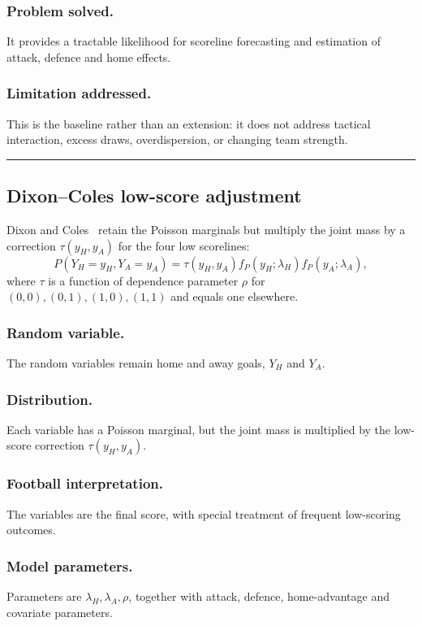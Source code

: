 \documentclass[11pt,a4paper]{amsart}
\numberwithin{equation}{section}
\begin{document}
\subsubsection*{Problem solved.} It provides a tractable likelihood for scoreline forecasting and estimation of attack, defence and home effects.
\subsubsection*{Limitation addressed.} This is the baseline rather than an extension: it does not address tactical interaction, excess draws, overdispersion, or changing team strength.

\noindent\rule{\textwidth}{0.4pt}

\subsection{Dixon--Coles low-score adjustment}
Dixon and Coles~\cite{dixoncoles1997} retain the Poisson marginals but multiply the joint mass by a correction $\tau(y_H,y_A)$ for the four low scorelines:
\begin{equation}
P(Y_H=y_H,Y_A=y_A)=\tau(y_H,y_A)f_P(y_H;\lambda_H)f_P(y_A;\lambda_A),
\end{equation}
where $\tau$ is a function of dependence parameter $\rho$ for $(0,0),(0,1),(1,0),(1,1)$ and equals one elsewhere.

\subsubsection*{Random variable.} The random variables remain home and away goals, $Y_H$ and $Y_A$.
\subsubsection*{Distribution.} Each variable has a Poisson marginal, but the joint mass is multiplied by the low-score correction $\tau(y_H,y_A)$.
\subsubsection*{Football interpretation.} The variables are the final score, with special treatment of frequent low-scoring outcomes.
\subsubsection*{Model parameters.} Parameters are $\lambda_H,\lambda_A,\rho$, together with attack, defence, home-advantage and covariate parameters.
\end{document}
